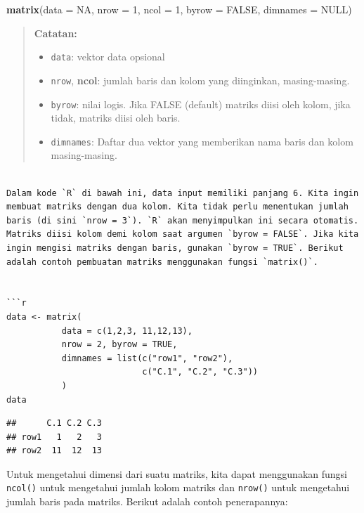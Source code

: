 \documentclass[
]{book}
\newenvironment{Shaded}{\begin{snugshade}}{\end{snugshade}}
\newcommand{\AttributeTok}[1]{\textcolor[rgb]{0.13,0.29,0.53}{#1}}
\newcommand{\ConstantTok}[1]{\textcolor[rgb]{0.56,0.35,0.01}{#1}}
\newcommand{\DecValTok}[1]{\textcolor[rgb]{0.00,0.00,0.81}{#1}}
\newcommand{\FunctionTok}[1]{\textcolor[rgb]{0.13,0.29,0.53}{\textbf{#1}}}
\newcommand{\NormalTok}[1]{#1}
\providecommand{\tightlist}{%
  \setlength{\itemsep}{0pt}\setlength{\parskip}{0pt}}
\theoremstyle{definition}
\theoremstyle{definition}
\theoremstyle{definition}
\theoremstyle{definition}
\theoremstyle{remark}
\begin{document}
\begin{Shaded}
\begin{Highlighting}[]
\FunctionTok{matrix}\NormalTok{(}\AttributeTok{data =} \ConstantTok{NA}\NormalTok{, }\AttributeTok{nrow =} \DecValTok{1}\NormalTok{, }\AttributeTok{ncol =} \DecValTok{1}\NormalTok{, }\AttributeTok{byrow =} \ConstantTok{FALSE}\NormalTok{,}
       \AttributeTok{dimnames =} \ConstantTok{NULL}\NormalTok{)}
\end{Highlighting}
\end{Shaded}

\begin{quote}
\textbf{Catatan:}

\begin{itemize}
\tightlist
\item
  \texttt{data}: vektor data opsional
\item
  \texttt{nrow}, \textbf{ncol}: jumlah baris dan kolom yang diinginkan, masing-masing.
\item
  \texttt{byrow}: nilai logis. Jika FALSE (default) matriks diisi oleh kolom, jika tidak, matriks diisi oleh baris.
\item
  \texttt{dimnames}: Daftar dua vektor yang memberikan nama baris dan kolom masing-masing.
\end{itemize}
\end{quote}

\begin{verbatim}

Dalam kode `R` di bawah ini, data input memiliki panjang 6. Kita ingin membuat matriks dengan dua kolom. Kita tidak perlu menentukan jumlah baris (di sini `nrow = 3`). `R` akan menyimpulkan ini secara otomatis. Matriks diisi kolom demi kolom saat argumen `byrow = FALSE`. Jika kita ingin mengisi matriks dengan baris, gunakan `byrow = TRUE`. Berikut adalah contoh pembuatan matriks menggunakan fungsi `matrix()`.


```r
data <- matrix(
           data = c(1,2,3, 11,12,13), 
           nrow = 2, byrow = TRUE,
           dimnames = list(c("row1", "row2"), 
                           c("C.1", "C.2", "C.3"))
           )
data
\end{verbatim}

\begin{verbatim}
##      C.1 C.2 C.3
## row1   1   2   3
## row2  11  12  13
\end{verbatim}

Untuk mengetahui dimensi dari suatu matriks, kita dapat menggunakan fungsi \texttt{ncol()} untuk mengetahui jumlah kolom matriks dan \texttt{nrow()} untuk mengetahui jumlah baris pada matriks. Berikut adalah contoh penerapannya:
\end{document}
